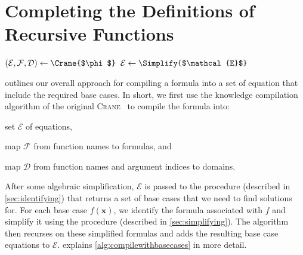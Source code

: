 \documentclass{article}
\theoremstyle{definition}
\begin{document}
\section{Completing the Definitions of Recursive Functions}\label{sec:main}

\begin{algorithm}[t]
  \caption{\protect\CompileWithBaseCases{$\phi$}}\label{alg:compilewithbasecases}
  $(\mathcal{E}, \mathcal{F}, \mathcal{D}) \gets \Crane{$\phi$}$\;\label{line:first}
  $\mathcal{E} \gets \Simplify{$\mathcal{E}$}$\;\label{line:second}
\end{algorithm}

 outlines our overall approach for compiling a
formula into a set of equation that include the required base cases. In short,
we first use the knowledge compilation algorithm of the original
\textsc{Crane}~\cite{DBLP:conf/kr/DilkasB23} to compile the formula into:
\begin{enumerate*}[label=(\roman*)]
  \item set $\mathcal{E}$ of equations,
  \item map $\mathcal{F}$ from function names to formulas, and
  \item map $\mathcal{D}$ from function names and argument indices to domains.
\end{enumerate*}
After some algebraic simplification, $\mathcal{E}$ is passed to the
\FindBaseCases procedure (described in \cref{sec:identifying}) that returns a
set of base cases that we need to find solutions for. For each base case
$f(\mathbf{x})$, we identify the formula associated with $f$ and simplify it
using the \Propagate procedure (described in \cref{sec:simplifying}). The
algorithm then recurses on these simplified formulas and adds the resulting base
case equations to $\mathcal{E}$.  explains
\cref{alg:compilewithbasecases} in more detail.
\end{document}
